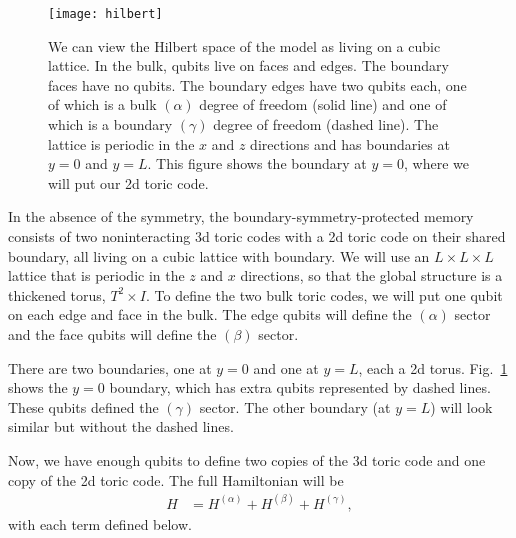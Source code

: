\begin{figure}[th!]
\centering
\texttt{[image: hilbert]}
\caption[Local Hilbert space for the model]{We can view the Hilbert space of the model as living on a cubic lattice. In the bulk, qubits live on faces and edges. The boundary faces have no qubits. The boundary edges have two qubits each, one of which is a bulk $(\alpha)$ degree of freedom (solid line) and one of which is a boundary $(\gamma)$ degree of freedom (dashed line). The lattice is periodic in the $x$ and $z$ directions and has boundaries at $y=0$ and $y=L$. This figure shows the boundary at $y=0$, where we will put our 2d toric code.}
\label{fig:hilbert}
\end{figure}

In the absence of the symmetry, the boundary-symmetry-protected memory consists of two noninteracting 3d toric codes with a 2d toric code on their shared boundary, all living on a cubic lattice with boundary. We will use an $L\times L\times L$ lattice that is periodic in the $z$ and $x$ directions, so that the global structure is a thickened torus, $T^2\times I$. To define the two bulk toric codes, we will put one qubit on each edge and face in the bulk. The edge qubits will define the $(\alpha)$ sector and the face qubits will define the $(\beta)$ sector.

There are two boundaries, one at $y=0$ and one at $y=L$, each a 2d torus.  Fig.~\ref{fig:hilbert} shows the $y=0$ boundary, which has extra qubits represented by dashed lines. These qubits defined the $(\gamma)$ sector.
The other boundary (at $y=L$) will look similar but without the dashed lines.

Now, we have enough qubits to define two copies of the 3d toric code and one copy of the 2d toric code. The full Hamiltonian will be
\begin{align}
H &= H^{(\alpha)} + H^{(\beta)} + H^{(\gamma)}, \label{eq:fullH}
\end{align}
with each term defined below. 

